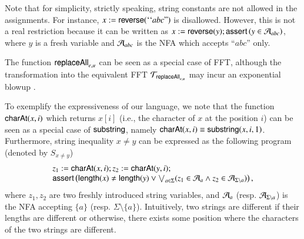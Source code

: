 \begin{remark}
Note that %
for simplicity, strictly speaking, string constants are not allowed in the assignments. %
For instance, %
$x:=\mathsf{reverse}({\mbox``}abc\mbox{''})$ is disallowed. However, this is not a real restriction because it can be written as $x:=\mathsf{reverse}(y); \textsf{assert}\left(y \in \mathcal{A}_{abc}\right)$, where $y$ is a fresh variable and $\mathcal{A}_{abc}$ is the NFA which accepts ``$abc$''  only.
\end{remark}


\begin{remark}
The function $\mathsf{replaceAll}_{e,u}$ can be seen as a special case of FFT, although the transformation into the equivalent FFT $\mathcal{T}_{\mathsf{replaceAll}_{e,u}}$ may incur an exponential blowup \cite{CCH+18}.
\end{remark}

To exemplify the expressiveness of our language, we note that the function $\mathsf{charAt}(x, i)$ which returns $x[i]$ (i.e., the character of $x$ at the position $i$) can be seen as a special case of $\mathsf{substring}$, namely $\mathsf{charAt}(x, i) \equiv \mathsf{substring}(x, i, 1)$. Furthermore, string inequality $x \neq y$ can be expressed as the following {\slint} program (denoted by $S_{x \neq y}$)
\[
\begin{array}{l}
z_1:=\mathsf{charAt}(x,i); z_2 := \mathsf{charAt}(y,i); \\
\textsf{assert}\left(\mathsf{length}(x) \neq \mathsf{length}(y) \vee \bigvee_{a \in \Sigma} (z_1 \in \mathcal{A}_a \wedge z_2 \in \mathcal{A}_{\Sigma \setminus a})\right),
\end{array}
\] 
where $z_1,z_2$ are two freshly introduced string variables, and $\mathcal{A}_a$ (resp. $\mathcal{A}_{\Sigma \setminus a}$) is the NFA accepting $\{a\}$ (resp. $\Sigma \setminus \{a\}$). Intuitively, two strings are different if their lengths are different or otherwise, there exists some position where the characters of the two strings are different.
 




